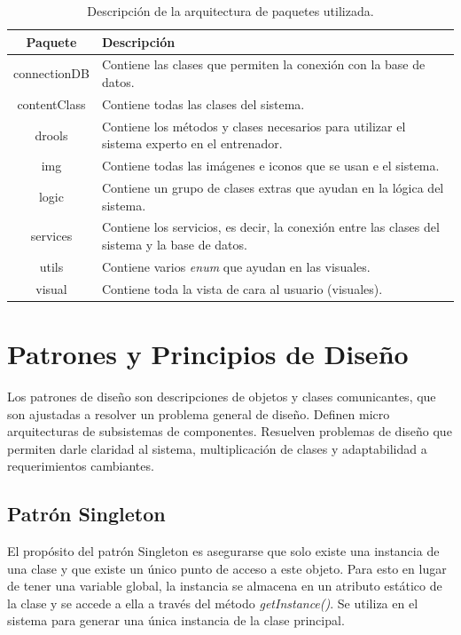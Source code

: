 \begin{table}[h]
\begin{center}
\begin{tabular}{ | c | p{11cm} | }
\hline
\textbf{Paquete} & \textbf{Descripción} \\
\hline
connectionDB & Contiene las clases que permiten la conexión con la base de datos. \\
\hline
contentClass & Contiene todas las clases del sistema. \\
\hline
drools & Contiene los métodos y clases necesarios para utilizar el sistema experto en el entrenador. \\
\hline
img & Contiene todas las imágenes e iconos que se usan e el sistema. \\
\hline
logic & Contiene un grupo de clases extras que ayudan en la lógica del sistema. \\
\hline
services & Contiene los servicios, es decir, la conexión entre las clases del sistema y la base de datos. \\
\hline
utils & Contiene varios \textsl{enum} que ayudan en las visuales. \\
\hline
visual & Contiene toda la vista de cara al usuario (visuales). \\
\hline
\end{tabular}
\caption{Descripción de la arquitectura de paquetes utilizada.}
\label{tab:actores}
\end{center}
\end{table}


\section{Patrones y Principios de Diseño}
Los patrones de diseño son descripciones de objetos y clases comunicantes, que son ajustadas a resolver un problema general de diseño. Definen micro arquitecturas de subsistemas de componentes. Resuelven problemas de diseño que permiten darle claridad al sistema, multiplicación de clases y adaptabilidad a requerimientos cambiantes.

\subsection{Patrón Singleton}
El propósito del patrón Singleton es asegurarse que solo existe una instancia de una clase y que existe un único punto de acceso a este objeto. Para esto en lugar de tener una variable global, la instancia se almacena en un atributo estático de la clase y se accede a ella a través del método \textsl{getInstance()}. Se utiliza en el sistema para generar una única instancia de la clase principal.

